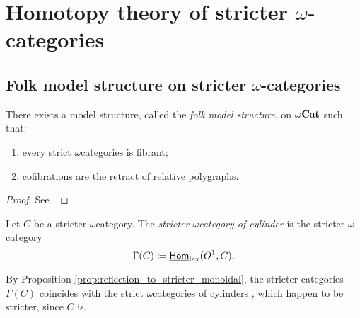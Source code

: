 \section{Homotopy theory of stricter \texorpdfstring{$\omega$}{ω}-categories}

\subsection{Folk model structure on stricter \texorpdfstring{$\omega$}{ω}-categories}

\begin{thm} \label{thm:folk_model_structure}
    There exists a model structure, called the \emph{folk model structure}, on \( {\omega\mathbf{Cat}} \) such that:
    \begin{enumerate}
        \item every strict \( \omega \)\nbd categories is fibrant;
        \item cofibrations are the retract of relative polygraphs. 
    \end{enumerate} 
\end{thm}
\begin{proof} 
    See \cite{lafont2010folk}.
\end{proof}

\begin{dfn} 
    Let \( C \) be a stricter \( \omega \)\nbd category.
    The \emph{stricter \( \omega \)\nbd category of cylinder} is the stricter \( \omega \)\nbd category 
    \begin{equation*}
       \Gamma(C) \coloneqq \underline{\mathsf{Hom}}_{\mathrm{lax}}(O^{1}, C). 
    \end{equation*}
\end{dfn}

\begin{rmk} \label{rmk:strict_stricter_same_cylinders}
    By Proposition \ref{prop:reflection_to_stricter_monoidal}, the stricter categories \( \Gamma(C) \) coincides with the strict \( \omega \)\nbd categories of cylinders \cite[Remark 20.2.9]{ara2025polygraphs}, which happen to be stricter, since \( C \) is.
\end{rmk}

